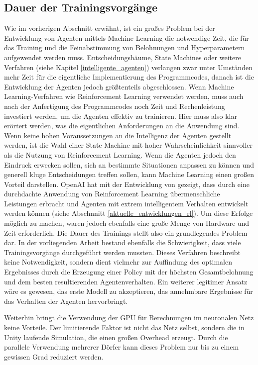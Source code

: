 \subsection{Dauer der Trainingsvorgänge}
Wie im vorherigen Abschnitt erwähnt, ist ein großes Problem bei der Entwicklung von Agenten mittels Machine Learning die notwendige Zeit, die für das Training und die Feinabstimmung von Belohnungen und Hyperparametern aufgewendet werden muss. Entscheidungsbäume, State Machines oder weitere Verfahren (siehe Kapitel \ref{intelligente_agenten}) verlangen zwar unter Umständen mehr Zeit für die eigentliche Implementierung des Programmcodes, danach ist die Entwicklung der Agenten jedoch größtenteils abgeschlossen. Wenn Machine Learning-Verfahren wie Reinforcement Learning verwendet werden, muss auch nach der Anfertigung des Programmcodes noch Zeit und Rechenleistung investiert werden, um die Agenten effektiv zu trainieren. Hier muss also klar erörtert werden, was die eigentlichen Anforderungen an die Anwendung sind. Wenn keine hohen Voraussetzungen an die Intelligenz der Agenten gestellt werden, ist die Wahl einer State Machine mit hoher Wahrscheinlichkeit sinnvoller als die Nutzung von Reinforcement Learning. Wenn die Agenten jedoch den Eindruck erwecken sollen, sich an bestimmte Situationen anpassen zu können und generell kluge Entscheidungen treffen sollen, kann Machine Learning einen großen Vorteil darstellen. OpenAI hat mit der Entwicklung von  gezeigt, dass durch eine durchdachte Anwendung von Reinforcement Learning übermenschliche Leistungen erbracht und Agenten mit extrem intelligentem Verhalten entwickelt werden können \cite{openai_five} (siehe Abschnnitt \ref{aktuelle_entwicklungen_rl}). Um diese Erfolge möglich zu machen, waren jedoch ebenfalls eine große Menge von Hardware und Zeit erforderlich. Die Dauer des Trainings stellt also ein grundlegendes Problem dar.
In der vorliegenden Arbeit bestand ebenfalls die Schwierigkeit, dass viele Trainingsvorgänge durchgeführt werden mussten. Dieses Verfahren beschreibt keine Notwendigkeit, sondern dient vielmehr zur Auffindung des optimalen Ergebnisses durch die Erzeugung einer Policy mit der höchsten Gesamtbelohnung und dem besten resultierenden Agentenverhalten. Ein weiterer legitimer Ansatz wäre es gewesen, das erste  Modell zu akzeptieren, das annehmbare Ergebnisse für das Verhalten der Agenten hervorbringt.

Weiterhin bringt die Verwendung der GPU für Berechnungen im neuronalen Netz keine Vorteile. Der limitierende Faktor ist nicht das Netz selbst, sondern die in Unity laufende Simulation, die einen großen Overhead erzeugt. Durch die parallele Verwendung mehrerer Dörfer kann dieses Problem nur bis zu einem gewissen Grad reduziert werden.

